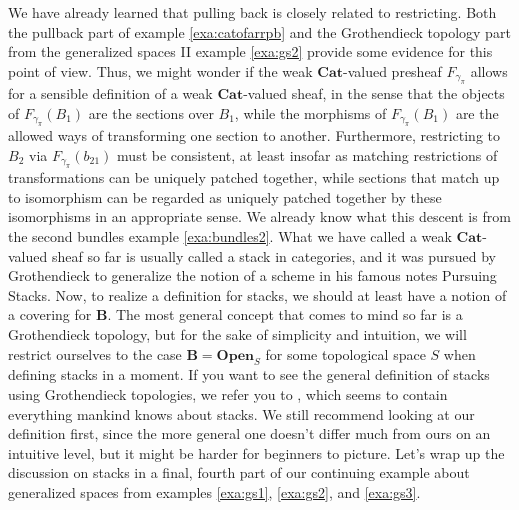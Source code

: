 We have already learned that pulling back is closely related to restricting.
Both the pullback part of example \ref{exa:catofarrpb} and the Grothendieck topology part from the generalized spaces II example \ref{exa:gs2} provide some evidence for this point of view.
Thus, we might wonder if the weak $\mathbf{Cat}$-valued presheaf $F_{\gamma_{\pi}}$ allows for a sensible definition of a weak $\mathbf{Cat}$-valued sheaf, in the sense that the objects of $F_{\gamma_{\pi}}(B_{1})$ are the sections over $B_{1}$, while the morphisms of $F_{\gamma_{\pi}}(B_{1})$ are the allowed ways of transforming one section to another.
Furthermore, restricting to $B_{2}$ via $F_{\gamma_{\pi}}(b_{21})$ must be consistent, at least insofar as matching restrictions of transformations can be uniquely patched together, while sections that match up to isomorphism can be regarded as uniquely patched together by these isomorphisms in an appropriate sense.
We already know what this {\glqq}descent{\grqq} is from the second bundles example \ref{exa:bundles2}.
What we have called a weak $\mathbf{Cat}$-valued sheaf so far is usually called a {\glqq}stack in categories{\grqq}, and it was pursued by Grothendieck to generalize the notion of a scheme in his famous notes {\glqq}Pursuing Stacks{\grqq}.
Now, to realize a definition for stacks, we should at least have a notion of a covering for $\mathbf{B}$.
The most general concept that comes to mind so far is a Grothendieck topology, but for the sake of simplicity and intuition, we will restrict ourselves to the case $\mathbf{B} = \mathbf{Open}_{S}$ for some topological space $S$ when defining stacks in a moment.
If you want to see the general definition of stacks using Grothendieck topologies, we refer you to \cite{d9dadd6d}, which seems to contain everything mankind knows about stacks.
We still recommend looking at our definition first, since the more general one doesn't differ much from ours on an intuitive level, but it might be harder for beginners to picture.
Let's wrap up the discussion on stacks in a final, fourth part of our continuing example about generalized spaces from examples \ref{exa:gs1}, \ref{exa:gs2}, and \ref{exa:gs3}.
\\
